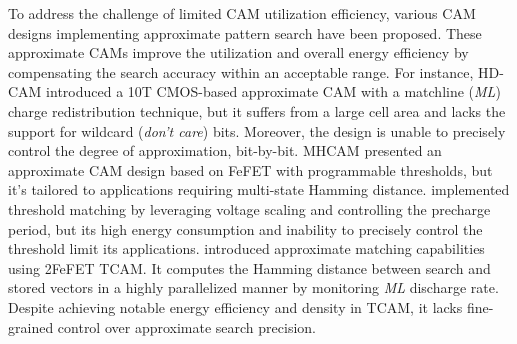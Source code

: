 To address the challenge of limited CAM utilization efficiency, 
various CAM designs implementing approximate pattern search have been proposed. 
These approximate CAMs improve the utilization and overall energy efficiency by compensating the search accuracy within an acceptable range. 
For instance, HD-CAM \cite{conventionalCAM} introduced a 10T CMOS-based approximate CAM with a matchline (\textit{ML}) charge redistribution technique, but it suffers from a large cell area and lacks the support for wildcard (\textit{don’t care}) bits.
Moreover, the  design is unable to precisely control the degree of approximation, bit-by-bit.
MHCAM \cite{liu2023reconfigurable} presented an approximate CAM design based on FeFET with programmable thresholds, but it's tailored to applications requiring multi-state Hamming distance. 
\cite{MASC} implemented threshold matching by leveraging voltage scaling and controlling the precharge period, but its high energy consumption and inability to precisely control the threshold limit its applications.
\cite{2FeFETa} introduced approximate matching capabilities using 2FeFET TCAM. It computes the Hamming distance between search and stored vectors in a highly parallelized manner by monitoring \textit{ML} discharge rate. Despite achieving notable energy efficiency and density in TCAM, it lacks fine-grained control over approximate search precision.


